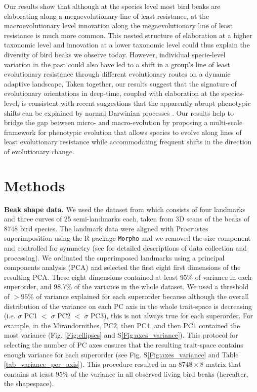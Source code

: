 \documentclass[12pt,letterpaper]{article}
\begin{document}
Our results show that although at the species level most bird beaks are elaborating along a megaevolutionary line of least resistance, at the macroevolutionary level innovation along the megaevolutionary line of least resistance is much more common.
This nested structure of elaboration at a higher taxonomic level and innovation at a lower taxonomic level could thus explain the diversity of bird beaks we observe today.
However, individual specie-level variation in the past could also have led to a shift in a group's line of least evolutionary resistance through different evolutionary routes on a dynamic adaptive landscape, Taken together, our results suggest that the signature of evolutionary orientations in deep-time, coupled with elaboration at the species-level, is consistent with recent suggestions that the apparently abrupt phenotypic shifts can be explained by normal Darwinian processes \cite{pagel2022general}.
Our results help to bridge the gap between micro- and macro-evolution by proposing a multi-scale framework for  phenotypic evolution that allows species to evolve along lines of least evolutionary resistance while accommodating frequent shifts in the direction of evolutionary change.

\section{Methods}


\textbf{Beak shape data.}
We used the dataset from \cite{cooney2017mega,chira2020signature,hughes2022global} which consists of four landmarks and three curves of 25 semi-landmarks each, taken from 3D scans of  the beaks of 8748 bird species.
The landmark data were aligned with Procrustes superimposition using the R package \texttt{Morpho} \cite{Rcore,Morpho} and we removed the size component and controlled for symmetry (see \cite{cooney2017mega,chira2020signature,hughes2022global} for detailed descriptions of data collection and processing).
We ordinated the superimposed landmarks using a principal components analysis (PCA) and selected the first eight first dimensions of the resulting PCA.
These eight dimensions contained at least 95\% of variance in each superorder, and 98.7\% of the variance in the whole dataset.
We used a threshold of $>95$\% of variance explained for each superorder because although the overall distribution of the variance on each PC axis in the whole trait-space is decreasing (i.e.
$\sigma$ PC1 $<$ $\sigma$ PC2 $<$ $\sigma$ PC3), this is not always true for each superorder.
For example, in the Mirandornithes, PC2, then PC4, and then PC1 contained the most variance (Fig. \ref{Fig:ellipses} and S\ref{Fig:axes_variance}).
This protocol for selecting the number of PC axes ensures that the resulting trait-space contains enough variance for each superorder (see Fig. S\ref{Fig:axes_variance} and Table \ref{tab_variance_per_axis}).
This procedure resulted in an $8748 \times 8$ matrix that contains at least 95\% of the variance in all observed living bird beaks (hereafter, the shapespace).
\end{document}
